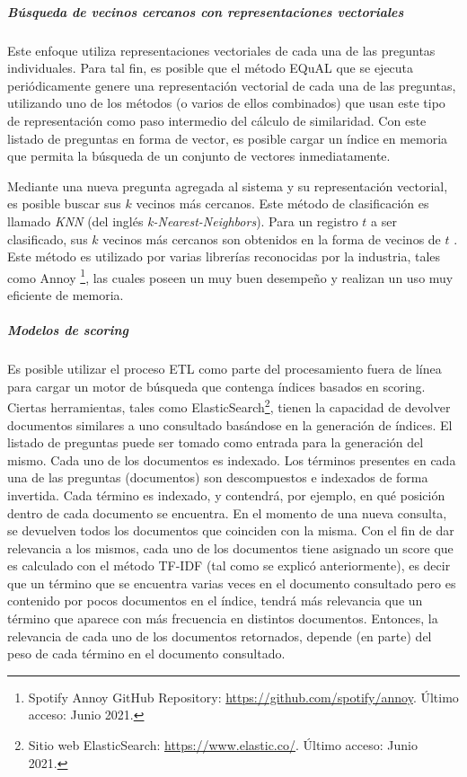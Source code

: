\subparagraph{Búsqueda de vecinos cercanos con representaciones vectoriales}
Este enfoque utiliza representaciones vectoriales de cada una de las preguntas individuales. Para tal fin, es posible que el método EQuAL que se ejecuta periódicamente genere una representación vectorial de cada una de las preguntas, utilizando uno de los métodos (o varios de ellos combinados) que usan este tipo de representación como paso intermedio del cálculo de similaridad. Con este listado de preguntas en forma de vector, es posible cargar un índice en memoria que permita la búsqueda de un conjunto de vectores inmediatamente.

\bigskip Mediante una nueva pregunta agregada al sistema y su representación vectorial, es posible buscar sus \(k\) vecinos más cercanos. Este método de clasificación es llamado \textit{KNN} (del inglés \textit{k-Nearest-Neighbors}). Para un registro \(t\) a ser clasificado, sus \(k\) vecinos más cercanos son obtenidos en la forma de vecinos de \(t\) \citep{guo2003knn}. Este método es utilizado por varias librerías reconocidas por la industria, tales como Annoy \footnote{Spotify Annoy GitHub Repository: \url{https://github.com/spotify/annoy}. Último acceso: Junio 2021.}, las cuales poseen un muy buen desempeño y realizan un uso muy eficiente de memoria.

\subparagraph{Modelos de scoring}
Es posible utilizar el proceso ETL como parte del procesamiento fuera de línea para cargar un motor de búsqueda que contenga índices basados en scoring. Ciertas herramientas, tales como ElasticSearch\footnote{Sitio web ElasticSearch: \url{https://www.elastic.co/}. Último acceso: Junio 2021.}, tienen la capacidad de devolver documentos similares a uno consultado basándose en la generación de índices. El listado de preguntas puede ser tomado como entrada para la generación del mismo. Cada uno de los documentos es indexado. Los términos presentes en cada una de las preguntas (documentos) son descompuestos e indexados de forma invertida. Cada término es indexado, y contendrá, por ejemplo, en qué posición dentro de cada documento se encuentra. En el momento de una nueva consulta, se devuelven todos los documentos que coinciden con la misma. Con el fin de dar relevancia a los mismos, cada uno de los documentos tiene asignado un score que es calculado con el método TF-IDF (tal como se explicó anteriormente), es decir que un término que se encuentra varias veces en el documento consultado pero es contenido por pocos documentos en el índice, tendrá más relevancia que un término que aparece con más frecuencia en distintos documentos. Entonces, la relevancia de cada uno de los documentos retornados, depende (en parte) del peso de cada término en el documento consultado.

